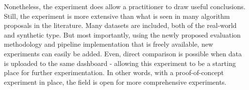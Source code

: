 \documentclass[../main.tex]{subfiles}
\begin{document}
Nonetheless, the experiment does allow a practitioner to draw useful conclusions. Still, the experiment is more extensive than what is seen in many algorithm proposals in the literature. Many datasets are included, both of the real-world and synthetic type. But most importantly, using the newly proposed evaluation methodology and pipeline implementation that is freely available, new experiments can easily be added. Even, direct comparison is possible when data is uploaded to the same dashboard - allowing this experiment to be a starting place for further experimentation. In other words, with a proof-of-concept experiment in place, the field is open for more comprehensive experiments.

\biblio
\end{document}
